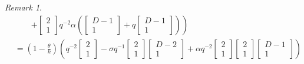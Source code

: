 \documentclass[
]{book}
\theoremstyle{definition}
\theoremstyle{definition}
\theoremstyle{definition}
\theoremstyle{definition}
\theoremstyle{remark}
\newtheorem*{remark}{Remark}
\begin{document}
\begin{remark}
\begin{align}
& \qquad \left. +\begin{bmatrix}{2}\\{1}\end{bmatrix}q^{-2}\alpha\left(\begin{bmatrix}{D-1}\\{1}\end{bmatrix}+q\begin{bmatrix}{D-1}\\{1}\end{bmatrix}\right)\right)\\
& = \left(1-\frac{\theta}{k}\right)\left(q^{-2}\begin{bmatrix}{2}\\{1}\end{bmatrix}-\sigma q^{-1}\begin{bmatrix}{2}\\{1}\end{bmatrix}\begin{bmatrix}{D-2}\\{1}\end{bmatrix}+\alpha q^{-2}\begin{bmatrix}{2}\\{1}\end{bmatrix}\begin{bmatrix}{2}\\{1}\end{bmatrix}\begin{bmatrix}{D-1}\\{1}\end{bmatrix}\right)
\end{align}
\end{remark}
\end{document}
